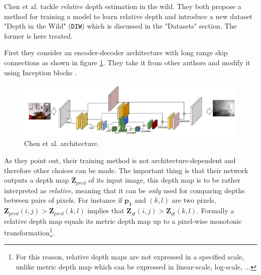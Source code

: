 Chen et al. \cite{DIW} tackle \textit{relative} depth estimation in the wild.
They both propose a method for training a model to learn relative depth and introduce a new dataset "Depth in the Wild" (\texttt{DIW}) which is discussed in the "Datasets" section.
The former is here treated.

First they consider an encoder-decoder architecture with long range skip connections as shown in figure \ref{fig:DIW_architecture}.
They take it from other authors and modify it using Inception blocks \cite{Inception}.

\begin{figure}
\centering
\includegraphics[scale=0.4]{figs/DIW_architecture}
\caption{Chen et al. \cite{DIW} architecture. \label{fig:DIW_architecture}}
\end{figure}

As they point out, their training method is not architecture-dependent and therefore other choices can be made.
The important thing is that their network outputs a depth map $\mathbf{Z}_{pred}$ of its input image, this depth map is to be rather interpreted as \textit{relative}, meaning that it can be \textit{only} used for comparing depths between pairs of pixels.
For instance if $\mathbf{p_{1}}$ and $(k,l)$ are two pixels, $\mathbf{Z}_{pred}(i,j) > \mathbf{Z}_{pred}(k,l)$ implies that $\mathbf{Z}_{gt}(i,j) > \mathbf{Z}_{gt}(k,l)$.
Formally a relative depth map equals its metric depth map up to a pixel-wise monotonic transformation\footnote{For this reason, relative depth maps are not expressed in a specified scale, unlike metric depth map which can be expressed in linear-scale, log-scale, ...}.

